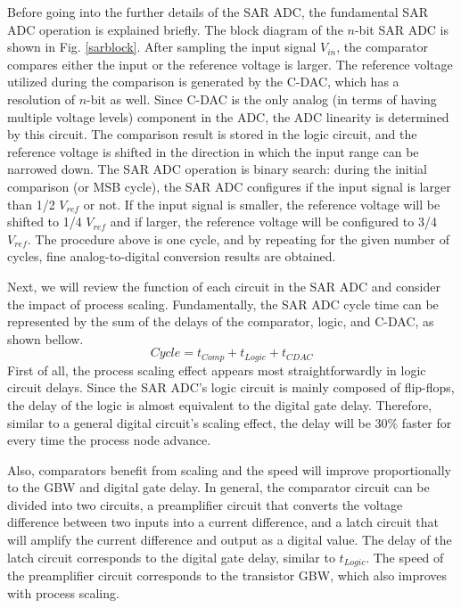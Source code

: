 Before going into the further details of the SAR ADC, the fundamental SAR ADC operation is explained briefly.
The block diagram of the $n$-bit SAR ADC is shown in Fig. \ref{sarblock}.
After sampling the input signal $V_{in}$, the comparator compares either the input or the reference voltage is larger.
The reference voltage utilized during the comparison is generated by the C-DAC, which has a resolution of $n$-bit as well.
Since C-DAC is the only analog (in terms of having multiple voltage levels) component in the ADC, the ADC linearity is determined by this circuit.
The comparison result is stored in the logic circuit, and the reference voltage is shifted in the direction in which the input range can be narrowed down.
The SAR ADC operation is binary search: during the initial comparison (or MSB cycle), the SAR ADC configures if the input signal is larger than 1/2 $V_{ref}$ or not. 
If the input signal is smaller, the reference voltage will be shifted to 1/4 $V_{ref}$ and if larger, the reference voltage will be configured to 3/4 $V_{ref}$.
The procedure above is one cycle, and by repeating for the given number of cycles, fine analog-to-digital conversion results are obtained. 

Next, we will review the function of each circuit in the SAR ADC and consider the impact of process scaling.
Fundamentally, the SAR ADC cycle time can be represented by the sum of the delays of the comparator, logic, and C-DAC, as shown bellow.
\begin{equation}
     Cycle = t_{Comp} + t_{Logic} + t_{CDAC}
\end{equation}
First of all, the process scaling effect appears most straightforwardly in logic circuit delays.
Since the SAR ADC's logic circuit is mainly composed of flip-flops, the delay of the logic is almost equivalent to the digital gate delay. 
Therefore, similar to a general digital circuit's scaling effect, the delay will be 30\% faster for every time the process node advance.

Also, comparators benefit from scaling and the speed will improve proportionally to the GBW and digital gate delay. 
In general, the comparator circuit can be divided into two circuits, a preamplifier circuit that converts the voltage difference between two inputs into a current difference, and a latch circuit that will amplify the current difference and output as a digital value. The delay of the latch circuit corresponds to the digital gate delay, similar to $t_{Logic}$. 
The speed of the preamplifier circuit corresponds to the transistor GBW, which also improves with process scaling.

